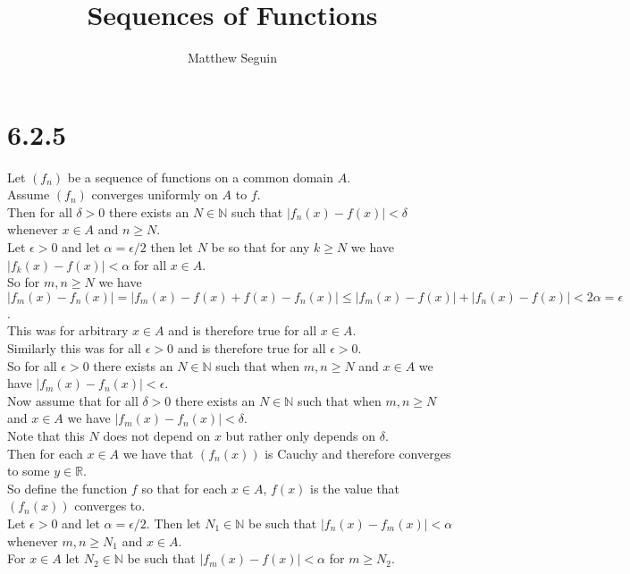 \documentclass{article}
\title{Sequences of Functions}
\author{Matthew Seguin}
\date{}
\begin{document}
\maketitle

\section*{6.2.5}
\begin{center}
    \doublespacing
    Let $(f_n)$ be a sequence of functions on a common domain $A$.
    \break
    \\Assume $(f_n)$ converges uniformly on $A$ to $f$.
    \\Then for all $\delta > 0$ there exists an $N\in\mathbb{N}$ such that $|f_n (x) - f(x)| <\delta$ whenever $x\in A$ and $n\geq N$.
    \\Let $\epsilon > 0$ and let $\alpha =\epsilon / 2$ then let $N$ be so that for any $k\geq N$ we have $|f_k (x) - f(x)| <\alpha$ for all $x\in A$.
    \\So for $m, n\geq N$ we have $|f_m (x) - f_n(x)| = |f_m (x) - f(x) + f(x) - f_n(x)|\leq |f_m (x) - f(x)| + |f_n (x) - f(x)| < 2\alpha =\epsilon$.
    \\This was for arbitrary $x\in A$ and is therefore true for all $x\in A$.
    \\Similarly this was for all $\epsilon > 0$ and is therefore true for all $\epsilon > 0$.
    \\So for all $\epsilon > 0$ there exists an $N\in\mathbb{N}$ such that when $m, n\geq N$ and $x\in A$ we have $|f_m (x) - f_n (x)| <\epsilon$.
    \break
    \\Now assume that for all $\delta > 0$ there exists an $N\in\mathbb{N}$ such that when $m, n\geq N$ and $x\in A$ we have $|f_m (x) - f_n (x)| <\delta$.
    \\Note that this $N$ does not depend on $x$ but rather only depends on $\delta$.
    \\Then for each $x\in A$ we have that $(f_n (x))$ is Cauchy and therefore converges to some $y\in\mathbb{R}$.
    \\So define the function $f$ so that for each $x\in A$, $f(x)$ is the value that $(f_n (x))$ converges to.
    \\Let $\epsilon > 0$ and let $\alpha =\epsilon / 2$. Then let $N_1\in\mathbb{N}$ be such that $|f_n (x) - f_m (x)| <\alpha$ whenever $m, n\geq N_1$ and $x\in A$.
    \\For $x\in A$ let $N_2\in\mathbb{N}$ be such that $|f_m (x) - f(x)| <\alpha$ for $m\geq N_2$.

\end{center}
\end{document}
